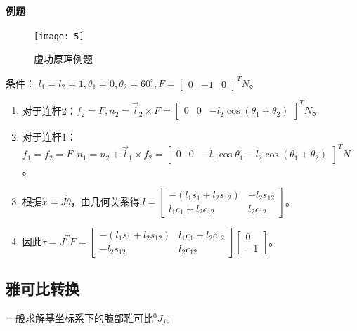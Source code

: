 \documentclass[
12pt, %
a4paper, 
oneside, %
headinclude,footinclude, %
]{scrartcl}
\begin{document}
\paragraph{例题}
\begin{figure}[H]
\centering 
\texttt{[image: 5]} 
\caption[虚功原理例题]{虚功原理例题}
\end{figure}
{\footnotesize
条件： $ l_1 = l_2 = 1, \theta_1 = 0, \theta_2 = 60^\circ, F = \begin{bmatrix} 0 & -1 & 0 \end{bmatrix}^T N $。
\begin{enumerate}
\item 对于连杆2：$ f_2 = F, n_2 = \vec{l}_2 \times F = \begin{bmatrix} 0 & 0 & -l_2 \cos(\theta_1 + \theta_2) \end{bmatrix}^T N $。
\item 对于连杆1：$ f_1 = f_2 = F, n_1 = n_2 + \vec{l}_1 \times f_2 = \begin{bmatrix} 0 & 0 & -l_1 \cos\theta_1 - l_2 \cos(\theta_1 + \theta_2) \end{bmatrix}^T N $。
\item 根据$ \dot{x} = J \dot{\theta} $，由几何关系得$ J = \begin{bmatrix} -(l_1 s_1 + l_2 s_{12}) & -l_2 s_{12} \\ l_1 c_1 + l_2 c_{12} & l_2 c_{12} \end{bmatrix} $。
\item 因此$ \tau = J^T F = \begin{bmatrix} -(l_1 s_1 + l_2 s_{12}) & l_1 c_1 + l_2 c_{12} \\ - l_2 s_{12} & l_2 c_{12} \end{bmatrix} \begin{bmatrix} 0 \\ -1 \end{bmatrix} $。
\end{enumerate}
}
\subsection{雅可比转换}\label{sec:Jacobian transform}\label{sec:bingxing_back1}
一般求解基坐标系下的腕部雅可比$ ^0 J_j $。
\end{document}
